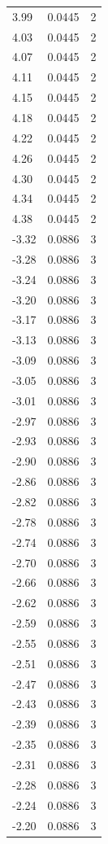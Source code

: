\begin{longtable}{lrr}
  3.99 & 0.0445 & 2 \\
  4.03 & 0.0445 & 2 \\
  4.07 & 0.0445 & 2 \\
  4.11 & 0.0445 & 2 \\
  4.15 & 0.0445 & 2 \\
  4.18 & 0.0445 & 2 \\
  4.22 & 0.0445 & 2 \\
  4.26 & 0.0445 & 2 \\
  4.30 & 0.0445 & 2 \\
  4.34 & 0.0445 & 2 \\
  4.38 & 0.0445 & 2 \\
  -3.32 & 0.0886 & 3 \\
  -3.28 & 0.0886 & 3 \\
  -3.24 & 0.0886 & 3 \\
  -3.20 & 0.0886 & 3 \\
  -3.17 & 0.0886 & 3 \\
  -3.13 & 0.0886 & 3 \\
  -3.09 & 0.0886 & 3 \\
  -3.05 & 0.0886 & 3 \\
  -3.01 & 0.0886 & 3 \\
  -2.97 & 0.0886 & 3 \\
  -2.93 & 0.0886 & 3 \\
  -2.90 & 0.0886 & 3 \\
  -2.86 & 0.0886 & 3 \\
  -2.82 & 0.0886 & 3 \\
  -2.78 & 0.0886 & 3 \\
  -2.74 & 0.0886 & 3 \\
  -2.70 & 0.0886 & 3 \\
  -2.66 & 0.0886 & 3 \\
  -2.62 & 0.0886 & 3 \\
  -2.59 & 0.0886 & 3 \\
  -2.55 & 0.0886 & 3 \\
  -2.51 & 0.0886 & 3 \\
  -2.47 & 0.0886 & 3 \\
  -2.43 & 0.0886 & 3 \\
  -2.39 & 0.0886 & 3 \\
  -2.35 & 0.0886 & 3 \\
  -2.31 & 0.0886 & 3 \\
  -2.28 & 0.0886 & 3 \\
  -2.24 & 0.0886 & 3 \\
  -2.20 & 0.0886 & 3 \\

\end{longtable}
